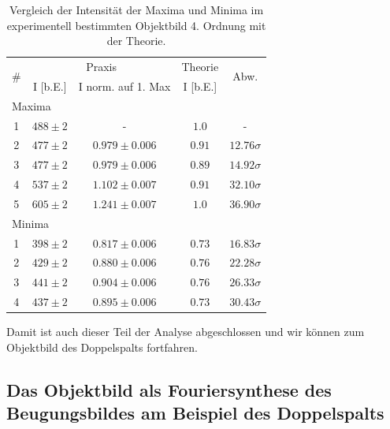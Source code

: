 \begin{table}[H]
  \centering
  \caption{Vergleich der Intensität der Maxima und Minima im experimentell bestimmten Objektbild 4. Ordnung mit der Theorie.}
  \vspace*{0.5em}
  \begin{tabular}{|c|c|c|c|c|}\hline
    \multirow{2}{*}{\#} & \multicolumn{2}{c|}{Praxis} & \multicolumn{1}{c|}{Theorie} & \multirow{2}{*}{Abw.}\\\cline{2-4}
        & I [b.E.] & I norm. auf 1. Max & I [b.E.] & \\\hline
    \multicolumn{5}{|l|}{Maxima}\\\hline
    1 & $488 \pm 2$ & - & $1.0$ & - \\
    2 & $477 \pm 2$ & $0.979 \pm 0.006$ & $0.91$ &  $12.76\sigma$ \\
    3 & $477 \pm 2$ & $0.979 \pm 0.006$ & $0.89$ &  $14.92\sigma$ \\
    4 & $537 \pm 2$ & $1.102 \pm 0.007$ & $0.91$ &  $32.10\sigma$ \\
    5 & $605 \pm 2$ & $1.241 \pm 0.007$ & $1.0$ &  $36.90\sigma$ \\\hline
    \multicolumn{5}{|l|}{Minima}\\\hline
    1 & $398 \pm 2$ & $0.817 \pm 0.006$ & $0.73$ & $16.83\sigma$ \\
    2 & $429 \pm 2$ & $0.880 \pm 0.006$ & $0.76$ & $22.28\sigma$ \\
    3 & $441 \pm 2$ & $0.904 \pm 0.006$ & $0.76$ & $26.33\sigma$ \\
    4 & $437 \pm 2$ & $0.895 \pm 0.006$ & $0.73$ & $30.43\sigma$ \\\hline
  \end{tabular}
  \label{tab:vergl_objbild_ma_mi_i_ord4}
\end{table}

Damit ist auch dieser Teil der Analyse abgeschlossen und wir können zum Objektbild des Doppelspalts fortfahren.

\subsection{Das Objektbild als Fouriersynthese des Beugungsbildes am Beispiel des Doppelspalts}


